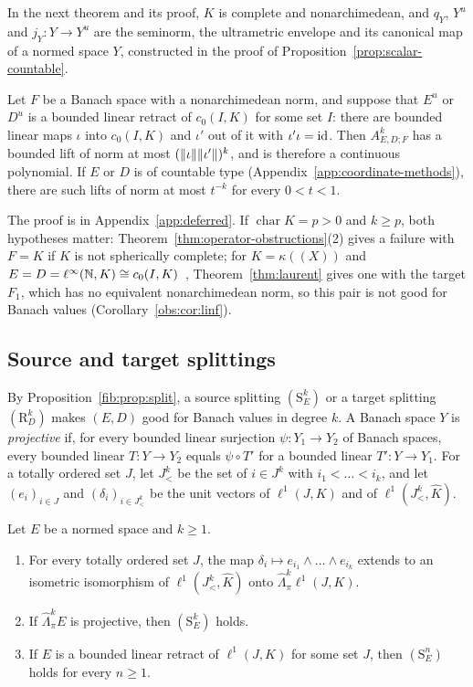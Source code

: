 In the next theorem and its proof, $K$ is complete and nonarchimedean, and $q_Y$, $Y^u$ and $j_Y\colon Y\to Y^u$ are the
seminorm, the ultrametric envelope and its canonical map of a normed space $Y$, constructed in the proof of
Proposition~\ref{prop:scalar-countable}.

\begin{theorem}\label{fib:thm:ultra}
Let $F$ be a Banach space with a nonarchimedean norm, and suppose that $E^u$ or $D^u$ is a bounded linear retract of
$c_0(I,K)$ for some set $I$: there are bounded linear maps $\iota$ into $c_0(I,K)$ and $\iota'$ out of it with
$\iota'\iota=\mathrm{id}$. Then $A^k_{E,D;F}$ has a bounded lift of norm at most $(\lVert \iota\rVert\lVert \iota'\rVert)^k$, and is therefore a continuous
polynomial. If $E$ or $D$ is of countable type (Appendix~\ref{app:coordinate-methods}), there are such lifts of norm at most $t^{-k}$ for every $0<t<1$.
\end{theorem}

The proof is in Appendix~\ref{app:deferred}. If $\operatorname{char}K=p>0$ and $k\ge p$, both hypotheses matter:
Theorem~\ref{thm:operator-obstructions}(2) gives a failure with $F=K$ if $K$ is not spherically complete; for
$K=\kappa((X))$ and $E=D=\ell^\infty(\mathbb N,K)\cong c_0(I,K)$~\cite[\S1, Proposition~1]{Se}, Theorem~\ref{thm:laurent} gives one
with the target $F_1$, which has no equivalent nonarchimedean norm, so this pair is not good for Banach values
(Corollary~\ref{obs:cor:linf}).

\subsection{Source and target splittings}\label{spl:ssec:source-target}

By Proposition~\ref{fib:prop:split}, a source splitting $(\mathrm S^k_E)$ or a target splitting $(\mathrm R^k_D)$ makes
$(E,D)$ good for Banach values in degree $k$. A Banach space $Y$ is \emph{projective} if, for every bounded linear
surjection $\psi\colon Y_1\to Y_2$ of Banach spaces, every bounded linear $T\colon Y\to Y_2$ equals $\psi\circ T'$ for a bounded
linear $T'\colon Y\to Y_1$. For a totally ordered set $J$, let $J^k_<$ be the set of $i\in J^k$ with $i_1<\dots<i_k$, and
let $(e_i)_{i\in J}$ and $(\delta_i)_{i\in J^k_<}$ be the unit vectors of $\ell^1(J,K)$ and of $\ell^1(J^k_<,\widehat K)$.

\begin{proposition}\label{spl:prop:projective}
Let $E$ be a normed space and $k\ge1$.
\begin{enumerate}
\item For every totally ordered set $J$, the map $\delta_i\mapsto e_{i_1}\wedge\dots\wedge e_{i_k}$ extends to an isometric
isomorphism of $\ell^1(J^k_<,\widehat K)$ onto $\widehat\Lambda^k_\pi\ell^1(J,K)$.
\item If $\widehat\Lambda^k_\pi E$ is projective, then $(\mathrm S^k_E)$ holds.
\item If $E$ is a bounded linear retract of $\ell^1(J,K)$ for some set $J$, then $(\mathrm S^n_E)$ holds for every $n\ge1$.
\end{enumerate}
\end{proposition}

